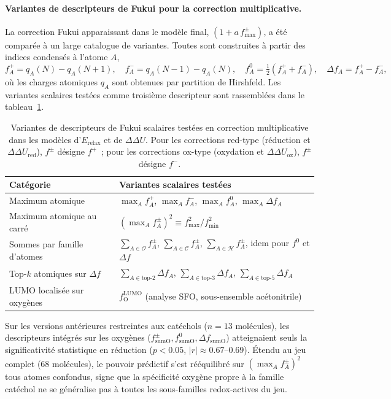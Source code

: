 \paragraph{Variantes de descripteurs de Fukui pour la correction multiplicative.}
La correction Fukui apparaissant dans le modèle final, $(1 + a\, f^\pm_{\max})$, a été comparée à un large catalogue de variantes. Toutes sont construites à partir des indices condensés à l'atome $A$,
\begin{equation}
f^+_A = q_A(N) - q_A(N+1), \quad
f^-_A = q_A(N-1) - q_A(N), \quad
f^0_A = \tfrac{1}{2}(f^+_A + f^-_A), \quad
\Delta f_A = f^+_A - f^-_A,
\label{eq:app_fukui_atomic}
\end{equation}
où les charges atomiques $q_A$ sont obtenues par partition de Hirshfeld. Les variantes scalaires testées comme troisième descripteur sont rassemblées dans le tableau~\ref{tab:app_fukui_variants}.

\begin{table}[H]
\centering
\caption{Variantes de descripteurs de Fukui scalaires testées en correction multiplicative dans les modèles d'$E_\text{relax}$ et de $\Delta\Delta U$. Pour les corrections \og{}red-type\fg{} (réduction et $\Delta\Delta U_\text{red}$), $f^\pm$ désigne $f^+$~; pour les corrections \og{}ox-type\fg{} (oxydation et $\Delta\Delta U_\text{ox}$), $f^\pm$ désigne $f^-$.}
\label{tab:app_fukui_variants}
\footnotesize
\begin{tabular}{l l}
\toprule
\textbf{Catégorie} & \textbf{Variantes scalaires testées} \\
\midrule
Maximum atomique & $\max_A f^+_A$, $\max_A f^-_A$, $\max_A f^0_A$, $\max_A \Delta f_A$ \\
Maximum atomique au carré & $(\max_A f^\pm_A)^2 \equiv f^2_{\max}/f^2_{\min}$ \\
Sommes par famille d'atomes & $\sum_{A \in \mathcal{O}} f^\pm_A$, $\sum_{A \in \mathcal{C}} f^\pm_A$, $\sum_{A \in \mathcal{H}} f^\pm_A$, idem pour $f^0$ et $\Delta f$ \\
Top-$k$ atomiques sur $\Delta f$ & $\sum_{A \in \text{top-}2} \Delta f_A$, $\sum_{A \in \text{top-}3} \Delta f_A$, $\sum_{A \in \text{top-}5} \Delta f_A$ \\
LUMO localisée sur oxygènes & $f_\text{O}^\text{LUMO}$ (analyse SFO, sous-ensemble acétonitrile) \\
\bottomrule
\end{tabular}
\end{table}

Sur les versions antérieures restreintes aux catéchols ($n = 13$ molécules), les descripteurs intégrés sur les oxygènes ($f^\pm_{\text{sumO}}, f^0_{\text{sumO}}, \Delta f_{\text{sumO}}$) atteignaient seuls la significativité statistique en réduction ($p < 0.05$, $|r| \approx 0.67$--$0.69$). Étendu au jeu complet (68 molécules), le pouvoir prédictif s'est rééquilibré sur $(\max_A f^\pm_A)^2$ tous atomes confondus, signe que la spécificité oxygène propre à la famille catéchol ne se généralise pas à toutes les sous-familles redox-actives du jeu.

